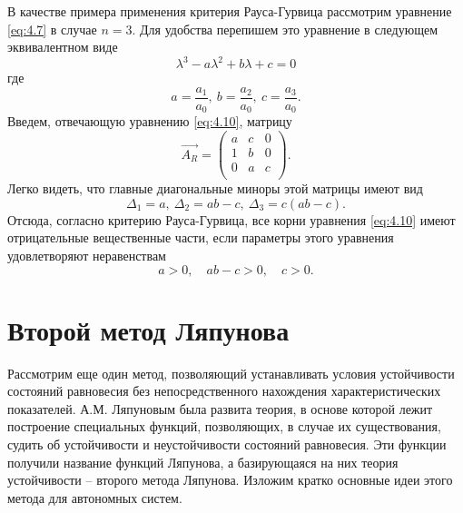 В качестве примера применения критерия Рауса-Гурвица рассмотрим уравнение \eqref{eq:4.7} в случае $n=3$. Для удобства перепишем это уравнение в следующем эквивалентном виде
\begin{equation}
        \label{eq:4.10}
        \lambda^3 - a \lambda^2 + b \lambda +c =0
\end{equation}
где
\begin{equation}
        \label{eq:}
        a= \frac{a_1}{a_0}, ~ b= \frac{a_2}{a_0}, ~ c= \frac{a_3}{a_0}.
\end{equation}
Введем, отвечающую уравнению \eqref{eq:4.10}, матрицу
\begin{equation}
        \label{eq:}
        \vec{A_R} = 
        \begin{pmatrix}
                a & c & 0 \\
                1 & b & 0 \\
                0 & a & c \\    
        \end{pmatrix}
        .
\end{equation}
Легко видеть, что главные диагональные миноры этой матрицы имеют вид
\begin{equation}
        \label{eq:4.11}
        \Delta_1 = a, ~ \Delta_2 = ab - c, ~ \Delta_3= c(ab-c).
\end{equation}
Отсюда, согласно критерию Рауса-Гурвица, все корни уравнения \eqref{eq:4.10} имеют отрицательные вещественные части, если параметры этого уравнения удовлетворяют неравенствам
\begin{equation}
        \label{eq:4.12}
        a>0, \quad ab-c>0, \quad c>0.
\end{equation}

\section{Второй метод Ляпунова}%
\label{sec:4.3}

Рассмотрим еще один метод, позволяющий устанавливать условия
устойчивости состояний равновесия без непосредственного нахождения
характеристических показателей. А.М. Ляпуновым была развита теория, в
основе которой лежит построение специальных функций, позволяющих, в
случае их существования, судить об устойчивости и неустойчивости состояний
равновесия. Эти функции получили название функций Ляпунова, а
базирующаяся на них теория устойчивости -- второго метода Ляпунова.
Изложим кратко основные идеи этого метода для автономных систем.

